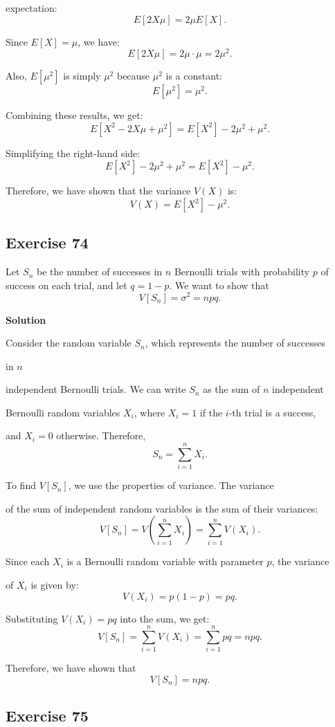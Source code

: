 \documentclass{article}
\begin{document}
expectation:
\[
E[2X\mu] = 2\mu E[X].
\]

Since \(E[X] = \mu\), we have:
\[
E[2X\mu] = 2\mu \cdot \mu = 2\mu^2.
\]

Also, \(E[\mu^2]\) is simply \(\mu^2\) because \(\mu^2\) is a constant:
\[
E[\mu^2] = \mu^2.
\]

Combining these results, we get:
\[
E[X^2 - 2X\mu + \mu^2] = E[X^2] - 2\mu^2 + \mu^2.
\]

Simplifying the right-hand side:
\[
E[X^2] - 2\mu^2 + \mu^2 = E[X^2] - \mu^2.
\]

Therefore, we have shown that the variance \(V(X)\) is:
\[
V(X) = E[X^2] - \mu^2.
\]

\subsection*{Exercise 74}

Let \( S_n \) be the number of successes in \( n \) Bernoulli trials with probability \( p \) of success on each trial, and let \( q = 1 - p \). We want to show that
\[
V[S_n] = \sigma^2 = npq.
\]

\textbf{Solution}

Consider the random variable \( S_n \), which represents the number of successes 

in \( n \) 

independent Bernoulli trials. We can write \( S_n \) as the sum of \( n \) independent 

Bernoulli random variables \( X_i \), where \( X_i = 1 \) if the \( i \)-th trial is a success, 

and \( X_i = 0 \) otherwise. Therefore,
\[
S_n = \sum_{i=1}^n X_i.
\]

To find \( V[S_n] \), we use the properties of variance. The variance 

of the sum of independent random variables is the sum of their variances:
\[
V[S_n] = V\left( \sum_{i=1}^n X_i \right) = \sum_{i=1}^n V(X_i).
\]

Since each \( X_i \) is a Bernoulli random variable with parameter \( p \), the variance 

of \( X_i \) is given by:
\[
V(X_i) = p(1 - p) = pq.
\]

Substituting \( V(X_i) = pq \) into the sum, we get:
\[
V[S_n] = \sum_{i=1}^n V(X_i) = \sum_{i=1}^n pq = npq.
\]

Therefore, we have shown that
\[
V[S_n] = npq.
\]

\subsection*{Exercise 75}
\end{document}
